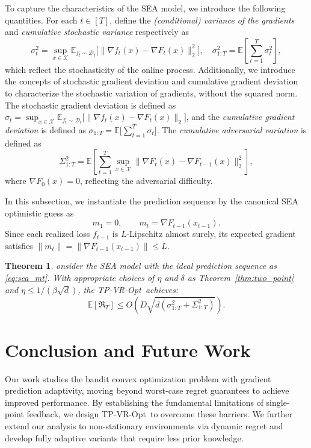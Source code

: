 \documentclass[journal,onecolumn]{IEEEtran}
\newcommand{\cD}{\mathcal{D}}
\newcommand{\cX}{\mathcal{X}}
\theoremstyle{plain}
\newtheorem{theorem}{Theorem}[section]
\theoremstyle{definition}
\theoremstyle{remark}
\newcommand{\regret}{\mathfrak{R}}
\newcommand{\tpvr}{{\sc TP-VR-Opt}}
\begin{document}
To capture the characteristics of the SEA model, we introduce the following
quantities. For each $t \in [T]$, define the
{\em (conditional) variance of the gradients} and
{\em cumulative stochastic variance} respectively as
\begin{equation*}
    \sigma_{t}^{2}= \sup_{x \in \cX}\mathbb{E}_{f_t \sim \cD_t}\big[ \| \nabla f_{t}
    (x) - \nabla F_{t}(x) \|_{2}^{2}\big],\quad \sigma_{1:T}^{2}= \mathbb{E}\left
    [ \sum_{t=1}^{T}\sigma_{t}^{2}\right],
\end{equation*}
which reflect the stochasticity of the online process. Additionally, we
introduce the concepts of stochastic gradient deviation and cumulative gradient
deviation to characterize the stochastic variation of gradients, without the squared
norm. The stochastic gradient deviation is defined as
$\sigma_{t}= \sup_{x \in \cX}\mathbb{E}_{f_t \sim \cD_t}\big[ \| \nabla f_{t}(x)
- \nabla F_{t}(x) \|_{2}\big]$, and the {\em cumulative gradient deviation} is defined
as $\sigma_{1:T}= \mathbb{E}\big[ \sum_{t=1}^{T}\sigma_{t}\big]$. The
{\em cumulative adversarial variation} is defined as
\begin{equation*}
    \Sigma_{1:T}^{2}= \mathbb{E}\left[ \sum_{t=1}^{T}\sup_{x \in \cX}\|\nabla F_{t}
    (x)- \nabla F_{t-1}(x)\|_{2}^{2}\right],
\end{equation*}
where $\nabla F_{0}(x) = 0$, reflecting the adversarial difficulty.

In this subsection, we instantiate the prediction sequence by the canonical SEA
optimistic guess as
\begin{equation}
    \label{eq:sea_mt}m_{1}=0, \qquad m_{t}=\nabla F_{t-1}(x_{t-1}).
\end{equation}
Since each realized loss $f_{t-1}$ is $L$-Lipschitz almost surely, its expected gradient
satisfies $\|m_{t}\| = \|\nabla F_{t-1}(x_{t-1})\| \le L$.

\begin{theorem}
    \label{thm:sea} onsider the SEA model with the ideal prediction sequence as \eqref{eq:sea_mt}.
    With appropriate choices of $\eta$ and $\delta$ as Theorem~\ref{thm:two_point}
    and $\eta \leq 1/(\beta\sqrt{d})$, the \tpvr\, achieves:
    \begin{equation*}
        \mathbb{E}[\regret_{T}]\le O\left(D\sqrt{d\left(\sigma_{1:T}^{2}+ \Sigma_{1:T}^{2}\right)}
        \right).
    \end{equation*}
\end{theorem}
\fi
    \section{Conclusion and Future Work}
    Our work studies the bandit convex optimization problem with gradient prediction adaptivity, moving beyond worst-case regret guarantees to achieve improved performance. By establishing the fundamental limitations of single-point feedback, we design \tpvr\, to overcome these barriers. We further extend our analysis to non-stationary environments via dynamic regret and develop fully adaptive variants that require less prior knowledge.
\end{document}
